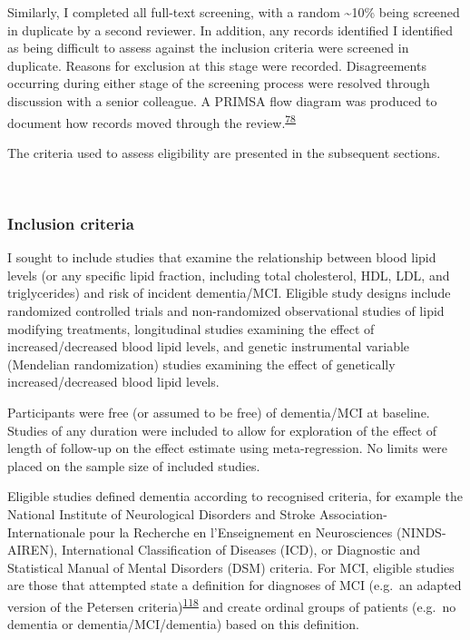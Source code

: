\documentclass[a4paper, twoside]{templates/ociamthesis}
\begin{document}
Similarly, I completed all full-text screening, with a random \textasciitilde10\% being screened in duplicate by a second reviewer. In addition, any records identified I identified as being difficult to assess against the inclusion criteria were screened in duplicate. Reasons for exclusion at this stage were recorded. Disagreements occurring during either stage of the screening process were resolved through discussion with a senior colleague. A PRIMSA flow diagram was produced to document how records moved through the review.\textsuperscript{\protect\hyperlink{ref-page2021}{78}}

The criteria used to assess eligibility are presented in the subsequent sections.

~

\hypertarget{inclusion-criteria}{%
\subsubsection{Inclusion criteria}\label{inclusion-criteria}}

I sought to include studies that examine the relationship between blood lipid levels (or any specific lipid fraction, including total cholesterol, HDL, LDL, and triglycerides) and risk of incident dementia/MCI. Eligible study designs include randomized controlled trials and non-randomized observational studies of lipid modifying treatments, longitudinal studies examining the effect of increased/decreased blood lipid levels, and genetic instrumental variable (Mendelian randomization) studies examining the effect of genetically increased/decreased blood lipid levels.

Participants were free (or assumed to be free) of dementia/MCI at baseline. Studies of any duration were included to allow for exploration of the effect of length of follow-up on the effect estimate using meta-regression. No limits were placed on the sample size of included studies.

Eligible studies defined dementia according to recognised criteria, for example the National Institute of Neurological Disorders and Stroke Association-Internationale pour la Recherche en l'Enseignement en Neurosciences (NINDS-AIREN), International Classification of Diseases (ICD), or Diagnostic and Statistical Manual of Mental Disorders (DSM) criteria. For MCI, eligible studies are those that attempted state a definition for diagnoses of MCI (e.g.~an adapted version of the Petersen criteria)\textsuperscript{\protect\hyperlink{ref-petersen1999}{118}} and create ordinal groups of patients (e.g.~no dementia or dementia/MCI/dementia) based on this definition.
\end{document}
